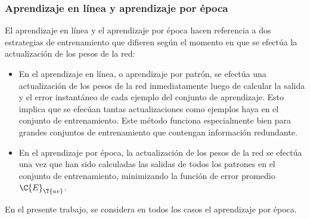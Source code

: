 %
\subsubsection{Aprendizaje en línea y aprendizaje por época}
%
El aprendizaje en línea y el aprendizaje por época hacen referencia
a dos estrategias de entrenamiento que difieren según
el momento en que se efectúa la actualización de los pesos de la
red:
%
\begin{itemize}
\item En el aprendizaje en línea, o aprendizaje por patrón, se efectúa una
  actualización de los pesos de la red inmediatamente
  luego de calcular la salida y el
  error instantáneo de cada ejemplo del conjunto de aprendizaje.
  Esto implica que se efecúan tantas actualizaciones como ejemplos haya
  en el conjunto de entrenamiento.
  Este método funciona especialmente bien
  para grandes conjuntos de entrenamiento que contengan información
  redundante.
\item En el aprendizaje por época, la actualización de los pesos de la red
  se efectúa una vez que han sido calculadas las salidas de todos los
  patrones en el conjunto de entrenamiento, minimizando la función de
  error promedio $\C{E}_{\T{av}}$.
\end{itemize}
%
En el presente trabajo, se considera en todos los casos el aprendizaje
por época.




